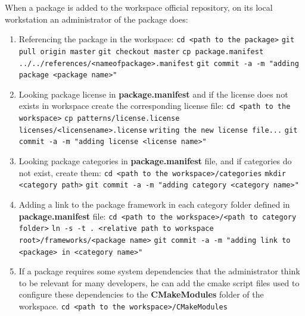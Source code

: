 \documentclass[12pt,a4paper]{article}
\begin{document}
When a package is added to the workspace official repository, on its local workstation an administrator of the package does:
\begin{enumerate}
\item Referencing the package in the workspace:
\linebreak \verb|cd <path to the package>|
\linebreak \verb|git pull origin master|
\linebreak \verb|git checkout master|
\linebreak \verb|cp package.manifest ../../references/<nameofpackage>.manifest|
\linebreak \verb|git commit -a -m "adding package <package name>"|
\item Looking package license in \textbf{package.manifest} and if the license does not exists in workspace create the corresponding license file:
\linebreak \verb|cd <path to the workspace>|
\linebreak \verb|cp patterns/license.license licenses/<licensename>.license|
\linebreak \verb|writing the new license file...|
\linebreak \verb|git commit -a -m "adding license <license name>"|
\item Looking package categories in \textbf{package.manifest} file, and if categories do not exist, create them:
\linebreak \verb|cd <path to the workspace>/categories|
\linebreak \verb|mkdir <category path>|
\linebreak \verb|git commit -a -m "adding category <category name>"|
\item Adding a link to the package framework in each category folder defined in \textbf{package.manifest} file:
\linebreak \verb|cd <path to the workspace>/<path to category folder>|
\linebreak \verb|ln -s -t . <relative path to workspace root>/frameworks/<package name>|
\linebreak \verb|git commit -a -m "adding link to <package> in <category name>"|
\item If a package requires some system dependencies that the administrator think to be relevant for many developers, he can add the cmake script files used to configure these dependencies to the \textbf{CMakeModules} folder of the workspace.
\linebreak \verb|cd <path to the workspace>/CMakeModules|

\end{enumerate}
\end{document}
